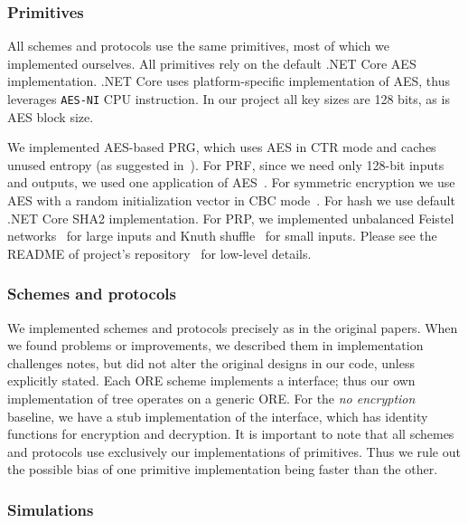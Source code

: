 		\subsubsection{Primitives}

			All schemes and protocols use the same primitives, most of which we implemented ourselves.
			All primitives rely on the default {.NET Core} AES implementation.
			{.NET Core} uses platform-specific implementation of AES, thus leverages \texttt{AES-NI} CPU instruction.
			In our project all key sizes are 128 bits, as is AES block size.

			We implemented AES-based PRG, which uses AES in CTR mode and caches unused entropy (as suggested in~\cite{aes-ctr-rfc}).
			For PRF, since we need only 128-bit inputs and outputs, we used one application of AES~\cite[Proposition 3.27]{intro-to-modern-crypto}.
			For symmetric encryption we use AES with a random initialization vector in CBC mode~\cite[Section 3.6.2]{intro-to-modern-crypto}.
			For hash we use default {.NET Core} SHA2 implementation.
			For PRP, we implemented unbalanced Feistel networks~\cite{unbalanced-feistel} for large inputs and Knuth shuffle~\cite{knuth-shuffle} for small inputs.
			Please see the README of project's repository~\cite{ore-project} for low-level details.

		\subsubsection{Schemes and protocols}

			We implemented schemes and protocols precisely as in the original papers.
			When we found problems or improvements, we described them in implementation challenges notes, but did not alter the original designs in our code, unless explicitly stated.
			Each ORE scheme implements a {\Csharp} interface; thus our own implementation of {\BPlus} tree operates on a generic ORE\@.
			For the \emph{no encryption} baseline, we have a stub implementation of the interface, which has identity functions for encryption and decryption.
			It is important to note that all schemes and protocols use exclusively our implementations of primitives.
			Thus we rule out the possible bias of one primitive implementation being faster than the other.

			

		\subsubsection{Simulations}

